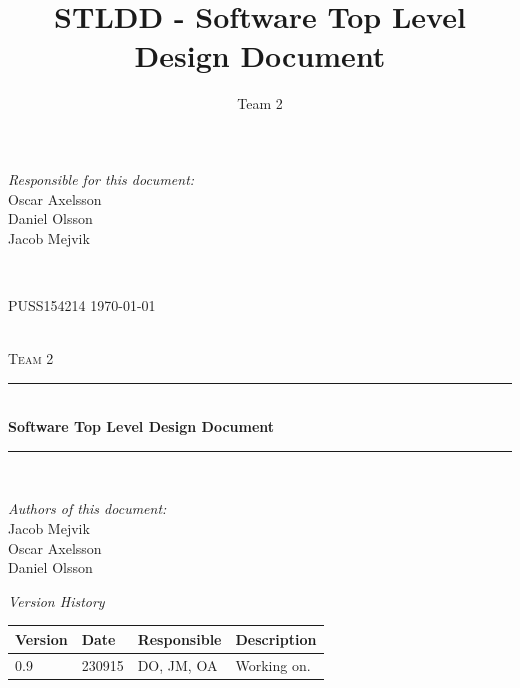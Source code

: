 \documentclass[a4paper]{article}
\title{STLDD - Software Top Level Design Document}
\author{Team 2}
\begin{document}
	\begin{titlepage}
		\newcommand{\HRule}{\rule{\linewidth}{0.5mm}}
		
		\begin{minipage}{0.5\textwidth}
			\begin{flushleft} %
				\textit{Responsible for this document:}\\
				Oscar Axelsson \\
				Daniel Olsson \\
				Jacob Mejvik
			\end{flushleft}
		\end{minipage}
		~
		\begin{minipage}{0.4\textwidth}
			\begin{flushright}
				PUSS154214
				\today
			\end{flushright}
		\end{minipage}\\[3cm]
		
		\centering
		\textsc{\LARGE Team 2}\\[0.5cm]
		
		\HRule \\[0.4cm]
		{ \huge \bfseries Software Top Level Design Document}\\[0.4cm] %
		\HRule \\[1.5cm]
		
		\vfill
		\begin{flushleft}
			\textit{Authors of this document:}\\
			Jacob Mejvik \\
			Oscar Axelsson \\
			Daniel Olsson
		\end{flushleft}
		
	\end{titlepage}
	\setcounter{tocdepth}{2}
	
	\begin{center}
		\textit{\large Version History}
		
		\begin{tabular}{ | l | l | l | p{5cm} |}
			\hline
			\textbf{Version} 	& \textbf{Date} 	& \textbf{Responsible} 	& \textbf{Description} 		\\ \hline
			0.9				 	& 230915 			& DO, JM, OA			&  Working on. 				\\ \hline
		\end{tabular}
	\end{center}
	
\end{document}
